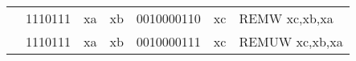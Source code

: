 \begin{table}[p]
\begin{small}
\begin{center}
\begin{tabular}{rcccccccccl}
&
\multicolumn{2}{|c|}{1110111} &
\multicolumn{1}{c|}{xa} &
\multicolumn{1}{c|}{xb} &
\multicolumn{4}{c|}{0010000110} &
\multicolumn{1}{c|}{xc} & REMW xc,xb,xa \\
\cline{2-10}
  

&
\multicolumn{2}{|c|}{1110111} &
\multicolumn{1}{c|}{xa} &
\multicolumn{1}{c|}{xb} &
\multicolumn{4}{c|}{0010000111} &
\multicolumn{1}{c|}{xc} & REMUW xc,xb,xa \\
\cline{2-10}
  

\end{tabular}
\end{center}
\end{small}

\label{instr-table}
\end{table}
  

\newpage


